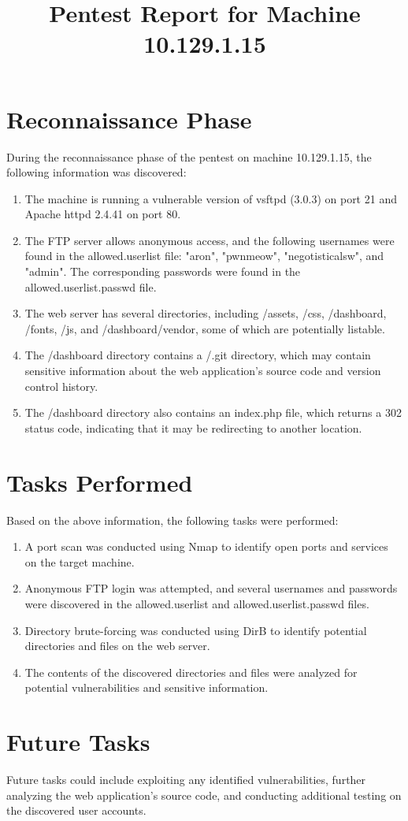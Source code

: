 \documentclass{article}
\title{Pentest Report for Machine 10.129.1.15}
\author{}
\date{}
\begin{document}
\maketitle

\section{Reconnaissance Phase}

During the reconnaissance phase of the pentest on machine 10.129.1.15, the following information was discovered:

\begin{enumerate}
    \item The machine is running a vulnerable version of vsftpd (3.0.3) on port 21 and Apache httpd 2.4.41 on port 80.
    \item The FTP server allows anonymous access, and the following usernames were found in the allowed.userlist file: "aron", "pwnmeow", "negotisticalsw", and "admin". The corresponding passwords were found in the allowed.userlist.passwd file.
    \item The web server has several directories, including /assets, /css, /dashboard, /fonts, /js, and /dashboard/vendor, some of which are potentially listable.
    \item The /dashboard directory contains a /.git directory, which may contain sensitive information about the web application's source code and version control history.
    \item The /dashboard directory also contains an index.php file, which returns a 302 status code, indicating that it may be redirecting to another location.
\end{enumerate}

\section{Tasks Performed}

Based on the above information, the following tasks were performed:

\begin{enumerate}
    \item A port scan was conducted using Nmap to identify open ports and services on the target machine.
    \item Anonymous FTP login was attempted, and several usernames and passwords were discovered in the allowed.userlist and allowed.userlist.passwd files.
    \item Directory brute-forcing was conducted using DirB to identify potential directories and files on the web server.
    \item The contents of the discovered directories and files were analyzed for potential vulnerabilities and sensitive information.
\end{enumerate}

\section{Future Tasks}

Future tasks could include exploiting any identified vulnerabilities, further analyzing the web application's source code, and conducting additional testing on the discovered user accounts.
\end{document}
